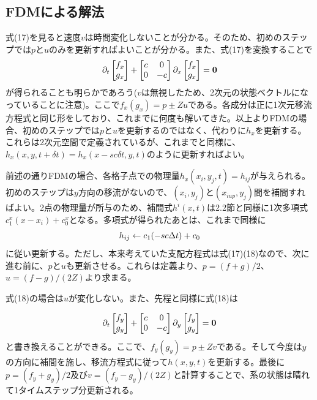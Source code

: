 \documentclass[dvipdfmx, 9pt, a4paper]{jsarticle}
\newcommand{\bm}[1]{{\mbox{\boldmath $#1$}}}
\begin{document}
\subsection{FDMによる解法}
式(17)を見ると速度$v$は時間変化しないことが分かる。そのため、初めのステップでは$p$と$u$のみを更新すればよいことが分かる。また、式(17)を変換することで
\begin{equation}
\partial_t
\begin{bmatrix}
f_x \\ g_x
\end{bmatrix}
+
\begin{bmatrix}
c & 0 \\
0 & -c \\
\end{bmatrix}
\partial_x
\begin{bmatrix}
f_x \\ g_x
\end{bmatrix}=\bm 0
\end{equation}
が得られることも明らかであろう($v$は無視したため、2次元の状態ベクトルになっていることに注意)。ここで$f_x(g_x)=p\pm Zu$である。各成分は正に1次元移流方程式と同じ形をしており、これまでに何度も解いてきた。以上よりFDMの場合、初めのステップでは$p$と$u$を更新するのではなく、代わりに$h_x$を更新する。これらは2次元空間で定義されているが、これまでと同様に、$h_x(x, y, t+\delta t)=h_x(x-sc\delta t, y, t)$のように更新すればよい。\par
前述の通りFDMの場合、各格子点での物理量$h_x(x_i, y_j, t)=h_{ij}$が与えられる。初めのステップは$y$方向の移流がないので、$(x_i, y_j)$と$(x_{iup}, y_j)$間を補間すればよい。2点の物理量が所与のため、補間式$h^i(x, t)$は2.2節と同様に1次多項式$c^x_1(x-x_i)+c^x_0$となる。多項式が得られたあとは、これまで同様に
\begin{equation}
h_{ij} \leftarrow c_1(-sc\Delta t) + c_0 \notag
\end{equation}
に従い更新する。ただし、本来考えていた支配方程式は式(17)(18)なので、次に進む前に、$p$と$u$も更新させる。これらは定義より、$p=(f+g)/2$、$u=(f-g)/(2Z)$より求まる。\par
式(18)の場合は$u$が変化しない。また、先程と同様に式(18)は

\begin{equation}
\partial_t
\begin{bmatrix}
f_y \\ g_y
\end{bmatrix}
+
\begin{bmatrix}
c & 0 \\
0 & -c \\
\end{bmatrix}
\partial_y
\begin{bmatrix}
f_y \\ g_y
\end{bmatrix}=\bm 0
\end{equation}
と書き換えることができる。ここで、$f_y(g_y)=p\pm Zv$である。そして今度は$y$の方向に補間を施し、移流方程式に従って$h(x, y, t)$を更新する。最後に$p=(f_y+g_y)/2$及び$v=(f_y-g_y)/(2Z)$と計算することで、系の状態は晴れて1タイムステップ分更新される。
\end{document}

